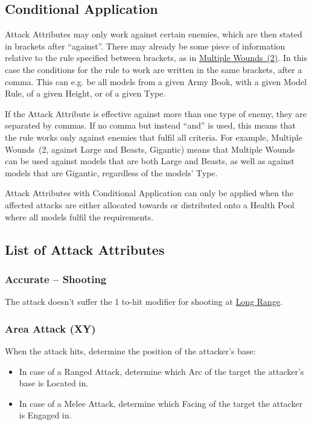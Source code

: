 \newpage
\subsection{Conditional Application}
\label{conditional_application}

Attack Attributes may only work against certain enemies, which are then stated in brackets after \enquote{against}. There may already be some piece of information relative to the rule specified between brackets, as in \hyperref[multiple_wounds]{Multiple Wounds~(2)}. In this case the conditions for the rule to work are written in the same brackets, after a comma. This can e.g. be all models from a given Army Book, with a given Model Rule, of a given Height, or of a given Type.

If the Attack Attribute is effective against more than one type of enemy, they are separated by commas. If no comma but instead \enquote{and} is used, this means that the rule works only against enemies that fulfil all criteria. For example, Multiple Wounds~(2, against Large and Beasts, Gigantic) means that Multiple Wounds can be used against models that are both Large and Beasts, as well as against models that are Gigantic, regardless of the models' Type.

Attack Attributes with Conditional Application can only be applied when the affected attacks are either allocated towards or distributed onto a Health Pool where all models fulfil the requirements.

\subsection{List of Attack Attributes}
\label{list_of_attack_attributes}

\subsubsection{Accurate -- Shooting}
\idx[main=y]{\accurate}\label{accurate}

The attack doesn't suffer the \minuss{}1 to-hit modifier for shooting at \hyperref[long_range]{Long Range}.

\subsubsection{Area Attack (X\timess{}Y)}
\idx[main=y]{\areaattack{}}\label{area_attack}

When the attack hits, determine the position of the attacker's base:
\begin{itemize}
\item In case of a Ranged Attack, determine which Arc of the target the attacker's base is Located in.
\item In case of a Melee Attack, determine which Facing of the target the attacker is Engaged in.
\end{itemize}

